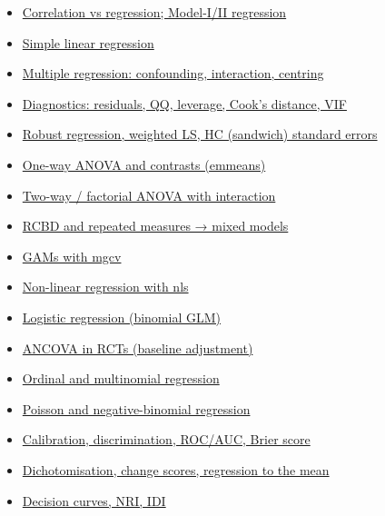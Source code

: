 \documentclass[
]{article}
\providecommand{\tightlist}{%
  \setlength{\itemsep}{0pt}\setlength{\parskip}{0pt}}
\begin{document}
\begin{itemize}
\tightlist
\item
  \href{labs/lab-correlation-vs-regression-model-i-ii-regression.Rmd}{Correlation
  vs regression; Model-I/II regression}
\item
  \href{labs/lab-simple-linear-regression.Rmd}{Simple linear regression}
\item
  \href{labs/lab-multiple-regression-confounding-interaction-centring.Rmd}{Multiple
  regression: confounding, interaction, centring}
\item
  \href{labs/lab-diagnostics-residuals-qq-leverage-cook-s-distance-vif.Rmd}{Diagnostics:
  residuals, QQ, leverage, Cook's distance, VIF}
\item
  \href{labs/lab-robust-regression-weighted-ls-hc-sandwich-standard-errors.Rmd}{Robust
  regression, weighted LS, HC (sandwich) standard errors}
\item
  \href{labs/lab-one-way-anova-and-contrasts-emmeans.Rmd}{One-way ANOVA
  and contrasts (emmeans)}
\item
  \href{labs/lab-two-way-factorial-anova-with-interaction.Rmd}{Two-way /
  factorial ANOVA with interaction}
\item
  \href{labs/lab-rcbd-and-repeated-measures-mixed-models.Rmd}{RCBD and
  repeated measures → mixed models}
\item
  \href{labs/lab-gams-with-mgcv.Rmd}{GAMs with mgcv}
\item
  \href{labs/lab-non-linear-regression-with-nls.Rmd}{Non-linear
  regression with nls}
\item
  \href{labs/lab-logistic-regression-binomial-glm.Rmd}{Logistic
  regression (binomial GLM)}
\item
  \href{labs/lab-ancova-in-rcts-baseline-adjustment.Rmd}{ANCOVA in RCTs
  (baseline adjustment)}
\item
  \href{labs/lab-ordinal-and-multinomial-regression.Rmd}{Ordinal and
  multinomial regression}
\item
  \href{labs/lab-poisson-and-negative-binomial-regression.Rmd}{Poisson
  and negative-binomial regression}
\item
  \href{labs/lab-calibration-discrimination-roc-auc-brier-score.Rmd}{Calibration,
  discrimination, ROC/AUC, Brier score}
\item
  \href{labs/lab-dichotomisation-change-scores-regression-to-the-mean.Rmd}{Dichotomisation,
  change scores, regression to the mean}
\item
  \href{labs/lab-decision-curves-nri-idi.Rmd}{Decision curves, NRI, IDI}
\end{itemize}
\end{document}
